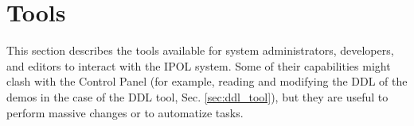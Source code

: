 \section{Tools}
This section describes the tools available for system administrators, developers, and editors to interact with the IPOL system. Some of their capabilities might clash with the Control Panel (for example, reading and modifying the DDL of the demos in the case of the DDL tool, Sec. \ref{sec:ddl_tool}), but they are useful to perform massive changes or to automatize tasks.



